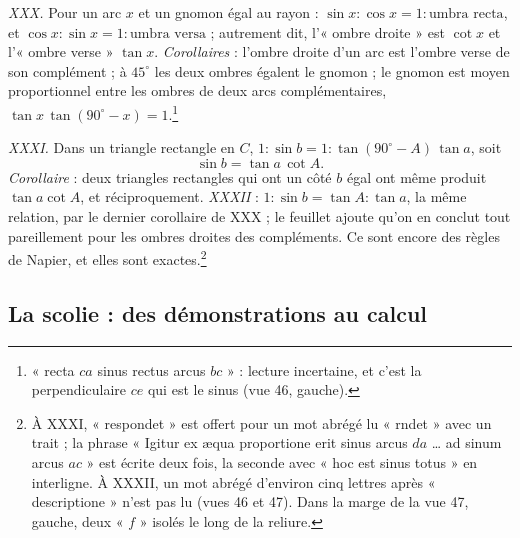 \documentclass[11pt,a4paper]{article}
\begin{document}
\emph{XXX.} Pour un arc $x$ et un gnomon égal au rayon :
$\sin x : \cos x = 1 : \text{umbra recta}$, et
$\cos x : \sin x = 1 : \text{umbra versa}$ ; autrement dit, l'« ombre droite » est
$\cot x$ et l'« ombre verse » $\tan x$. \emph{Corollaires} : l'ombre droite d'un
arc est l'ombre verse de son complément ; à $45^\circ$ les deux ombres égalent le
gnomon ; le gnomon est moyen proportionnel entre les ombres de deux arcs
complémentaires, $\tan x\,\tan(90^\circ - x) = 1$.\footnote{« recta $ca$ sinus
rectus arcus $bc$ » : lecture incertaine, et c'est la perpendiculaire $ce$ qui
est le sinus (vue 46, gauche).}

\emph{XXXI.} Dans un triangle rectangle en $C$,
$1 : \sin b = 1 : \tan(90^\circ - A)\,\tan a$, soit
\[
\sin b = \tan a\,\cot A .
\]
\emph{Corollaire} : deux triangles rectangles qui ont un côté $b$ égal ont même
produit $\tan a\cot A$, et réciproquement. \emph{XXXII} :
$1 : \sin b = \tan A : \tan a$, la même relation, par le dernier corollaire de
XXX ; le feuillet ajoute qu'on en conclut tout pareillement pour les ombres
droites des compléments. Ce sont encore des règles de Napier, et elles sont
exactes.\footnote{À XXXI, « respondet » est offert pour un mot abrégé lu « rndet »
avec un trait ; la phrase « Igitur ex æqua proportione erit sinus arcus $da$ …
ad sinum arcus $ac$ » est écrite deux fois, la seconde avec « hoc est sinus
totus » en interligne. À XXXII, un mot abrégé d'environ cinq lettres après
« descriptione » n'est pas lu (vues 46 et 47). Dans la marge de la vue 47,
gauche, deux « $f$ » isolés le long de la reliure.}

\subsection*{La scolie : des démonstrations au calcul}
\end{document}
